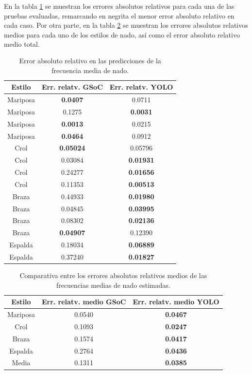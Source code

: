 En la tabla \ref{tab:tablaerroresprediccionesfrecuencia} se muestran los errores absolutos relativos para cada una de las pruebas evaluadas, remarcando en negrita el menor error absoluto relativo en cada caso. Por otra parte, en la tabla \ref{tab:tablaerroresmediosprediccionesfrecuencia} se muestran los errores absolutos relativos medios para cada uno de los estilos de nado, así como el error absoluto relativo medio total.

\begin{table}[]
    \centering
    \small
    \begin{tabular}{|c|c|c|} \hline
         Estilo & Err. relatv. GSoC & Err. relatv. YOLO  \\ \hline 
         Mariposa & \textbf{0.0407} & 0.0711 \\
         Mariposa & 0.1275 & \textbf{0.0031} \\
         Mariposa & \textbf{0.0013} & 0.0215 \\
         Mariposa & \textbf{0.0464} & 0.0912 \\
         Crol & \textbf{0.05024} & 0.05796 \\
         Crol & 0.03084 & \textbf{0.01931} \\
         Crol & 0.24277 & \textbf{0.01656} \\
         Crol & 0.11353 & \textbf{0.00513} \\
         Braza & 0.44933 & \textbf{0.01980} \\
         Braza & 0.04845 & \textbf{0.03995} \\
         Braza & 0.08302 & \textbf{0.02136} \\
         Braza & \textbf{0.04907} & 0.12390 \\
         Espalda & 0.18034 & \textbf{0.06889} \\
         Espalda & 0.37240 & \textbf{0.01827} \\ \hline
    \end{tabular}
    \caption{Error absoluto relativo en las predicciones de la frecuencia media de nado.}
    \label{tab:tablaerroresprediccionesfrecuencia}
\end{table}

\begin{table}[]
    \centering
    \small
    \begin{tabular}{|c|c|c|} \hline
         Estilo & Err. relatv. medio GSoC & Err. relatv. medio YOLO  \\ \hline
         Mariposa & 0.0540 & \textbf{0.0467} \\
         Crol & 0.1093 & \textbf{0.0247}  \\   
         Braza & 0.1574 & \textbf{0.0417} \\
         Espalda & 0.2764 & \textbf{0.0436} \\
         Media & 0.1311 & \textbf{0.0385} \\ \hline
    \end{tabular}
    \caption{Comparativa entre los errores absolutos relativos medios de las frecuencias medias de nado estimadas.}
    \label{tab:tablaerroresmediosprediccionesfrecuencia}
\end{table} 

